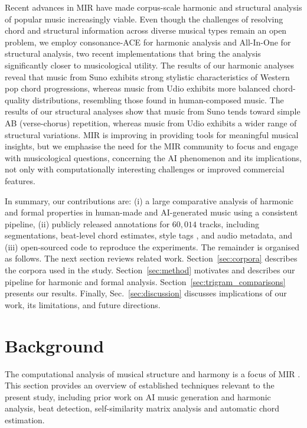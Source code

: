 \documentclass{article}
\begin{document}
Recent advances in MIR have made corpus-scale harmonic and structural analysis of popular music increasingly viable. Even though the challenges of resolving chord and structural information across diverse musical types remain an open problem, we employ consonance-ACE \citep{poltronieri2025discord} for harmonic analysis and All-In-One \citep{taejun2023allinone} for structural analysis, two recent implementations that bring the analysis significantly closer to musicological utility. The results of our harmonic analyses reveal that music from Suno exhibits strong stylistic characteristics of Western pop chord progressions, whereas music from Udio exhibits more balanced chord-quality distributions, resembling those found in human-composed music. The results of our structural analyses show that music from Suno tends toward simple AB (verse-chorus) repetition, whereas music from Udio exhibits a wider range of structural variations. MIR is improving in providing tools for meaningful musical insights, but we emphasise the need for the MIR community to focus and engage with musicological questions, concerning the AI phenomenon and its implications, not only with computationally interesting challenges or improved commercial features.

In summary, our contributions are:
(i) a large comparative analysis of harmonic and formal properties in human-made and AI-generated music using a consistent pipeline,
(ii) publicly released annotations for $60,014$ tracks, including segmentations, beat-level chord estimates, style tags \citep{oramas2018multimodal}, and audio metadata, and (iii) open-sourced code to reproduce the experiments. 
The remainder is organised as follows. The next section reviews related work. Section~\ref{sec:corpora} describes the corpora used in the study. Section~\ref{sec:method} motivates and describes our pipeline for harmonic and formal analysis. Section~\ref{sec:trigram_comparisons} presents our results. Finally, Sec.~\ref{sec:discussion} discusses implications of our work, its limitations, and future directions.

\section{Background}
\label{sec:background}

The computational analysis of musical structure and harmony is a focus of MIR \citep{Muller2015a}. This section provides an overview of established techniques relevant to the present study, including prior work on AI music generation and harmonic analysis, beat detection, self-similarity matrix analysis and automatic chord estimation.
\end{document}

